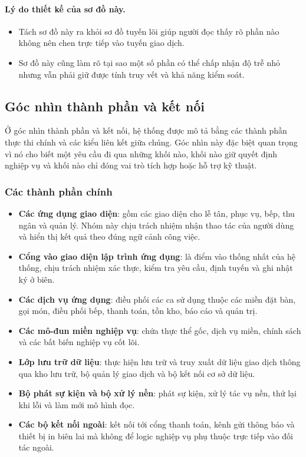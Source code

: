 \documentclass[11pt,a4paper]{article}
\begin{document}
\paragraph{Lý do thiết kế của sơ đồ này.}
\begin{itemize}
  \item Tách sơ đồ này ra khỏi sơ đồ tuyến lõi giúp người đọc thấy rõ phần nào không nên chen trực tiếp vào tuyến giao dịch.
  \item Sơ đồ này cũng làm rõ tại sao một số phần có thể chấp nhận độ trễ nhỏ nhưng vẫn phải giữ được tính truy vết và khả năng kiểm soát.
\end{itemize}

\subsection{Góc nhìn thành phần và kết nối}
Ở góc nhìn thành phần và kết nối, hệ thống được mô tả bằng các thành phần thực thi chính và các kiểu liên kết giữa chúng. Góc nhìn này đặc biệt quan trọng vì nó cho biết một yêu cầu đi qua những khối nào, khối nào giữ quyết định nghiệp vụ và khối nào chỉ đóng vai trò tích hợp hoặc hỗ trợ kỹ thuật.

\subsubsection{Các thành phần chính}
\begin{itemize}
  \item \textbf{Các ứng dụng giao diện}: gồm các giao diện cho lễ tân, phục vụ, bếp, thu ngân và quản lý. Nhóm này chịu trách nhiệm nhận thao tác của người dùng và hiển thị kết quả theo đúng ngữ cảnh công việc.
  \item \textbf{Cổng vào giao diện lập trình ứng dụng}: là điểm vào thống nhất của hệ thống, chịu trách nhiệm xác thực, kiểm tra yêu cầu, định tuyến và ghi nhật ký ở biên.
  \item \textbf{Các dịch vụ ứng dụng}: điều phối các ca sử dụng thuộc các miền đặt bàn, gọi món, điều phối bếp, thanh toán, tồn kho, báo cáo và quản trị.
  \item \textbf{Các mô-đun miền nghiệp vụ}: chứa thực thể gốc, dịch vụ miền, chính sách và các bất biến nghiệp vụ cốt lõi.
  \item \textbf{Lớp lưu trữ dữ liệu}: thực hiện lưu trữ và truy xuất dữ liệu giao dịch thông qua kho lưu trữ, bộ quản lý giao dịch và bộ kết nối cơ sở dữ liệu.
  \item \textbf{Bộ phát sự kiện và bộ xử lý nền}: phát sự kiện, xử lý tác vụ nền, thử lại khi lỗi và làm mới mô hình đọc.
  \item \textbf{Các bộ kết nối ngoài}: kết nối tới cổng thanh toán, kênh gửi thông báo và thiết bị in biên lai mà không để logic nghiệp vụ phụ thuộc trực tiếp vào đối tác ngoài.
\end{itemize}
\end{document}
